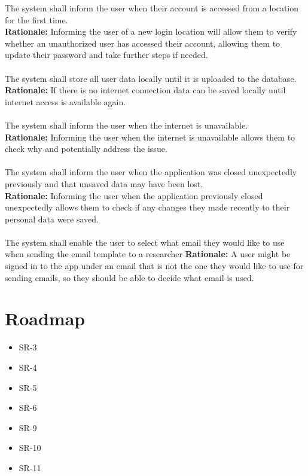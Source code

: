 \documentclass{article}
\begin{document}
The system shall inform the user when their account is accessed from a location for the first time. \\
\textbf{Rationale:}
Informing the user of a new login location will allow them to verify whether an unauthorized user has accessed their account, allowing them to update their password and take further steps if needed. \\~\\

The system shall store all user data locally until it is uploaded to the database. \\
\textbf{Rationale:}
If there is no internet connection data can be saved locally until internet access is available again.\\~\\

The system shall inform the user when the internet is unavailable. \\
\textbf{Rationale:}
Informing the user when the internet is unavailable allows them to check why and potentially address the issue. \\~\\

The system shall inform the user when the application was closed unexpectedly previously and that unsaved data may have been lost. \\
\textbf{Rationale:}
Informing the user when the application previously closed unexpectedly allows them to check if any changes they made recently to their personal data were saved. \\~\\

The system shall enable the user to select what email they would like to use when sending the email template to a researcher
\textbf{Rationale:}
A user might be signed in to the app under an email that is not the one they would like to use for sending emails, so they should be 
able to decide what email is used.

\section{Roadmap}

\begin{itemize}
    \item SR-3
    \item SR-4
    \item SR-5
    \item SR-6
    \item SR-9
    \item SR-10
    \item SR-11
\end{itemize}
\end{document}
